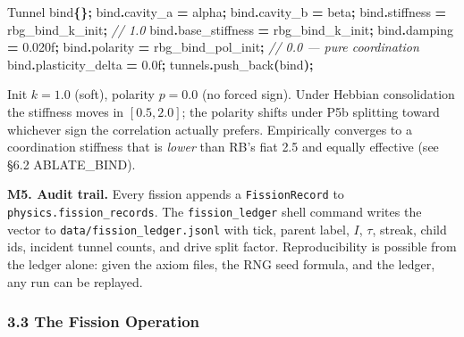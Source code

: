 \documentclass[
  11pt,
  a4paper,
]{article}
\newenvironment{Shaded}{\begin{snugshade}}{\end{snugshade}}
\newcommand{\BuiltInTok}[1]{#1}
\newcommand{\CommentTok}[1]{\textcolor[rgb]{0.56,0.35,0.01}{\textit{#1}}}
\newcommand{\FloatTok}[1]{\textcolor[rgb]{0.00,0.00,0.81}{#1}}
\newcommand{\NormalTok}[1]{#1}
\newcommand{\OperatorTok}[1]{\textcolor[rgb]{0.81,0.36,0.00}{\textbf{#1}}}
\begin{document}
\begin{Shaded}
\begin{Highlighting}[]
\NormalTok{Tunnel bind}\OperatorTok{\{\};}
\NormalTok{bind}\OperatorTok{.}\NormalTok{cavity\_a       }\OperatorTok{=}\NormalTok{ alpha}\OperatorTok{;}
\NormalTok{bind}\OperatorTok{.}\NormalTok{cavity\_b       }\OperatorTok{=}\NormalTok{ beta}\OperatorTok{;}
\NormalTok{bind}\OperatorTok{.}\NormalTok{stiffness      }\OperatorTok{=}\NormalTok{ rbg\_bind\_k\_init}\OperatorTok{;}   \CommentTok{// 1.0}
\NormalTok{bind}\OperatorTok{.}\NormalTok{base\_stiffness }\OperatorTok{=}\NormalTok{ rbg\_bind\_k\_init}\OperatorTok{;}
\NormalTok{bind}\OperatorTok{.}\NormalTok{damping        }\OperatorTok{=} \FloatTok{0.020}\BuiltInTok{f}\OperatorTok{;}
\NormalTok{bind}\OperatorTok{.}\NormalTok{polarity       }\OperatorTok{=}\NormalTok{ rbg\_bind\_pol\_init}\OperatorTok{;}  \CommentTok{// 0.0 — pure coordination}
\NormalTok{bind}\OperatorTok{.}\NormalTok{plasticity\_delta }\OperatorTok{=} \FloatTok{0.0}\BuiltInTok{f}\OperatorTok{;}
\NormalTok{tunnels}\OperatorTok{.}\NormalTok{push\_back}\OperatorTok{(}\NormalTok{bind}\OperatorTok{);}
\end{Highlighting}
\end{Shaded}

Init \(k = 1.0\) (soft), polarity \(p = 0.0\) (no forced sign). Under
Hebbian consolidation the stiffness moves in \([0.5, 2.0]\); the
polarity shifts under P5b splitting toward whichever sign the
correlation actually prefers. Empirically converges to a coordination
stiffness that is \emph{lower} than RB's fiat 2.5 and equally effective
(see §6.2 ABLATE\_BIND).

\textbf{M5. Audit trail.} Every fission appends a \texttt{FissionRecord}
to \texttt{physics.fission\_records}. The \texttt{fission\_ledger} shell
command writes the vector to \texttt{data/fission\_ledger.jsonl} with
tick, parent label, \(I\), \(\tau\), streak, child ids, incident tunnel
counts, and drive split factor. Reproducibility is possible from the
ledger alone: given the axiom files, the RNG seed formula, and the
ledger, any run can be replayed.

\subsubsection{3.3 The Fission Operation}\label{the-fission-operation}
\end{document}
